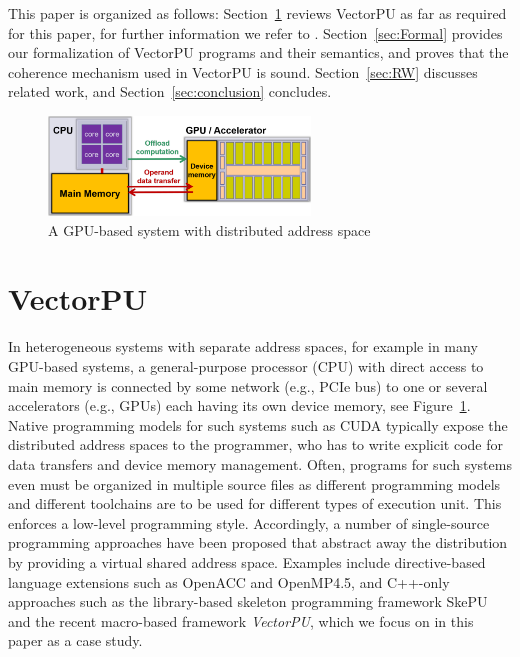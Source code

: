 This paper is organized as follows:
Section~\ref{VectorPU} reviews VectorPU as far as required for  this paper, for further information we refer to \cite{VectorPU-2017}.
Section~\ref{sec:Formal} provides our formalization of VectorPU programs and
their semantics, and proves that the coherence mechanism used in
VectorPU is sound. Section~\ref{sec:RW} discusses related work, and 
Section~\ref{sec:conclusion} concludes.

\begin{figure}
\begin{center}
\includegraphics[width=0.62\textwidth]{img/CPU-GPU.png}
\caption{\label{fig:CPU-GPU}A GPU-based system with distributed address space}
\end{center}
\end{figure}

\section{VectorPU}\label{VectorPU}

In heterogeneous systems with separate address spaces, for example in 
many GPU-based systems, a general-purpose processor
(CPU) with direct access to main memory is connected by some network
(e.g., PCIe bus) to one or several accelerators
(e.g., GPUs) each having its own device memory,
see Figure~\ref{fig:CPU-GPU}. Native programming models
for such systems such as CUDA typically expose the distributed address spaces to the programmer, who has to write explicit 
code for data transfers and device memory management.
Often, programs for such systems even must be organized in multiple source files
as different programming models and different toolchains
are to be used for different types of execution unit.
This enforces a low-level programming style. 
Accordingly, a number of single-source 
programming approaches have been proposed that abstract away the distribution 
by providing a virtual shared address space. Examples include directive-based
language extensions such as OpenACC and OpenMP4.5, and C++-only approaches 
such as the library-based skeleton programming framework SkePU \cite{Dastgeer-IJPP15}
and the recent macro-based framework \textit{VectorPU}, 
which we focus on in this paper as a case study.

